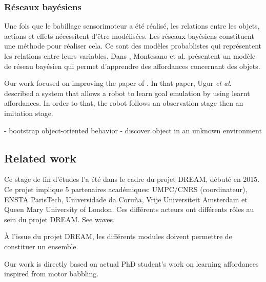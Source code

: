 \documentclass{llncs}
\begin{document}

\subsubsection{Réseaux bayésiens}
Une fois que le babillage sensorimoteur a été réalisé, les relations entre les objets, actions et effets nécessitent d'être modélisées. Les réseaux bayésiens constituent une méthode pour réaliser cela. Ce sont des modèles probablistes qui représentent les relations entre leurs variables. Dans \cite{4456755}, Montesano et al. présentent un modèle de réseau bayésien qui permet d'apprendre des affordances concernant des objets.

Our work focused on improving the paper of \cite{Ugur2011}. In that paper, Ugur \textit{et al}.
described a system that allows a robot to learn goal emulation by using learnt affordances. In order to that, the robot follows an observation stage then an imitation stage.

- bootstrap object-oriented behavior
- discover object in an unknown environment

\subsection{Related work}

Ce stage de fin d'études l'a été dans le cadre du projet DREAM, débuté en 2015. Ce projet implique 5 partenaires académiques: UMPC/CNRS (coordinateur), ENSTA ParisTech, Universidade da Coruña, Vrije Universiteit Amsterdam et Queen Mary University of London. Ces différents acteurs ont différents rôles au sein du projet DREAM. See waves.

\`A l'issue du projet DREAM, les différents modules doivent permettre de constituer un ensemble. 

Our work is directly based on actual PhD student's work on learning affordances inspired from motor babbling.
\end{document}
